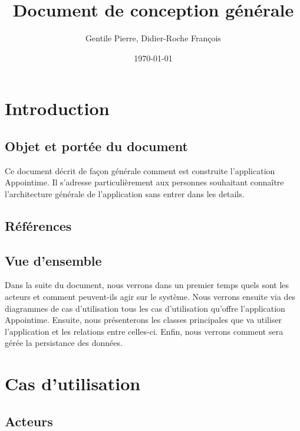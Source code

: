 \documentclass{article}
\author{Gentile Pierre, Didier-Roche François}
\date{\today}
\title{Document de conception générale}
\begin{document}
\maketitle

\newpage
\tableofcontents
\newpage


\section{Introduction}
\subsection{Objet et portée du document}
Ce document décrit de façon générale comment est construite l'application Appointime. Il s'adresse particulièrement
 aux personnes souhaitant connaître l'architecture générale de l'application sans entrer dans les details.


\subsection{Références}



\subsection{Vue d'ensemble}
Dans la suite du document, nous verrons dans un premier temps quels sont les acteurs et comment peuvent-ils agir 
sur le système. Nous verrons ensuite via des diagrammes de cas d'utilisation 
tous les cas d'utilisation qu'offre l'application Appointime. Ensuite, nous présenterons les classes
 principales que va utiliser l'application et les relations entre celles-ci. Enfin, nous verrons comment sera gérée la persistance des données.


\section{Cas d'utilisation}
\subsection{Acteurs}
\end{document}
